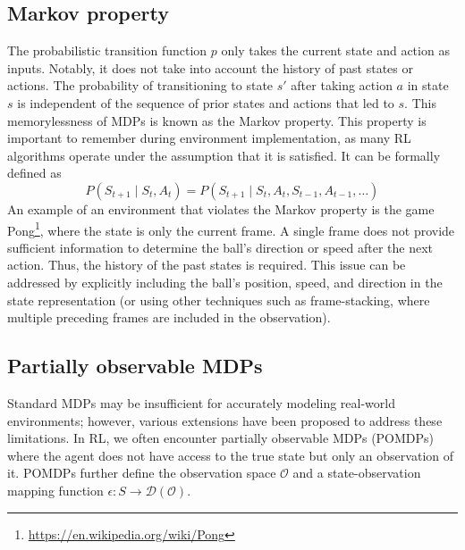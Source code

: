 \documentclass[
  digital,     %
  oneside,     %
  nosansbold,  %
  nocolorbold, %
  lof,         %
  lot,         %
]{fithesis4}
\begin{document}
\subsection{Markov property}
\label{subsec:markov_property}
The probabilistic transition function $p$ only takes the current state and action as inputs. Notably, it does not take into account the history of past states or actions. The probability of transitioning to state $s'$ after taking action $a$ in state $s$ is independent of the sequence of prior states and actions that led to $s$. This memorylessness of MDPs is known as the Markov property. This property is important to remember during environment implementation, as many RL algorithms operate under the assumption that it is satisfied. It can be formally defined as
\begin{equation}
P(S_{t+1}\mid S_t,A_t)=P(S_{t+1}\mid S_t,A_t,S_{t-1},A_{t-1}, \dotsc)
\end{equation}
An example of an environment that violates the Markov property is the game Pong\footnote{\url{https://en.wikipedia.org/wiki/Pong}}, where the state is only the current frame. A single frame does not provide sufficient information to determine the ball’s direction or speed after the next action. Thus, the history of the past states is required. This issue can be addressed by explicitly including the ball’s position, speed, and direction in the state representation (or using other techniques such as frame-stacking, where multiple preceding frames are included in the observation).

\subsection{Partially observable MDPs}
Standard MDPs may be insufficient for accurately modeling real-world environments; however, various extensions have been proposed to address these limitations. In RL, we often encounter partially observable MDPs (POMDPs) where the agent does not have access to the true state but only an observation of it. POMDPs further define the observation space $\mathcal{O}$ and a state-observation mapping function $\epsilon \colon S \to \mathcal{D}(\mathcal{O})$.
\end{document}
